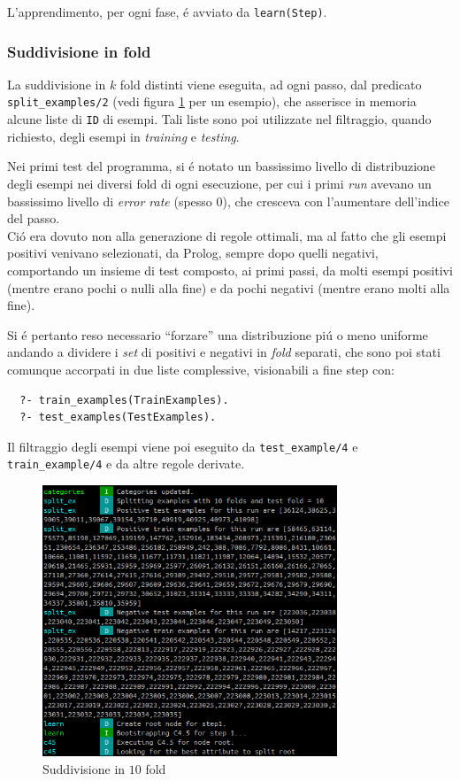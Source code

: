 \documentclass[preprint]{acm_proc_article-sp}
\begin{document}
L'apprendimento, per ogni fase, \'e avviato da \verb|learn(Step)|.

\subsubsection{Suddivisione in fold}
La suddivisione in $k$ fold distinti viene eseguita, ad ogni passo, dal predicato \verb|split_examples/2| (vedi figura \ref{fig:prolog-k-fold} per un esempio), che asserisce in memoria alcune liste di \verb|ID| di esempi. Tali liste sono poi utilizzate nel filtraggio, quando richiesto, degli esempi in \textit{training} e \textit{testing}.

Nei primi test del programma, si \'e notato un bassissimo livello di distribuzione degli esempi nei diversi fold di ogni esecuzione, per cui i primi \textit{run} avevano un bassissimo livello di \textit{error rate} (spesso $0$), che cresceva con l'aumentare dell'indice del passo.\\
Ci\'o era dovuto non alla generazione di regole ottimali, ma al fatto che gli esempi positivi venivano selezionati, da Prolog, sempre dopo quelli negativi, comportando un insieme di test composto, ai primi passi, da molti esempi positivi (mentre erano pochi o nulli alla fine) e da pochi negativi (mentre erano molti alla fine).

Si \'e pertanto reso necessario ``forzare'' una distribuzione pi\'u o meno uniforme andando a dividere i \textit{set} di positivi e negativi in \textit{fold} separati, che sono poi stati comunque accorpati in due liste complessive, visionabili a fine step con:
\begin{verbatim}
  ?- train_examples(TrainExamples).
  ?- test_examples(TestExamples).
\end{verbatim}

Il filtraggio degli esempi viene poi eseguito da \verb|test_example/4| e \verb|train_example/4| e da altre regole derivate.

\begin{figure}[!htb]
\centering
\includegraphics[width=250pt]{figures/prolog-k-fold.png}
\caption{Suddivisione in $10$ fold}
\label{fig:prolog-k-fold}
\end{figure}
\end{document}
